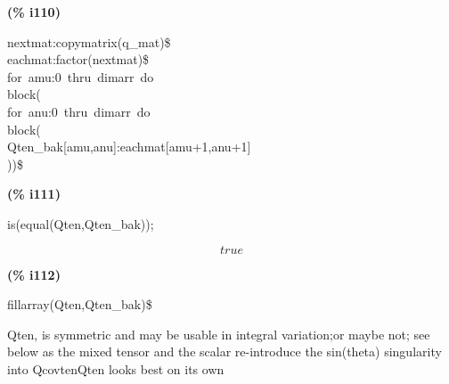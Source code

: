 \documentclass[fleqn]{article}
\begin{document}
\noindent
\begin{minipage}[t]{4.000000em}\color{red}\bfseries
(\% i110)	
\end{minipage}
\begin{minipage}[t]{\textwidth}\color{blue}
nextmat:copymatrix(q\_mat)\$\\
eachmat:factor(nextmat)\$\\
for\ amu:0\ thru\ dimarr\ do\\
block(\\
for\ anu:0\ thru\ dimarr\ do\\
block(\\
Qten\_bak[amu,anu]:eachmat[amu+1,anu+1]\\
))\$
\end{minipage}

\noindent%



\noindent
\begin{minipage}[t]{4.000000em}\color{red}\bfseries
(\% i111)	
\end{minipage}
\begin{minipage}[t]{\textwidth}\color{blue}
is(equal(Qten,Qten\_bak));
\end{minipage}
\[\displaystyle \tag{\% o111} 
true\mbox{}
\]


\noindent
\begin{minipage}[t]{4.000000em}\color{red}\bfseries
(\% i112)	
\end{minipage}
\begin{minipage}[t]{\textwidth}\color{blue}
fillarray(Qten,Qten\_bak)\$
\end{minipage}

\noindent%

Qten, is symmetric and may be usable in integral variation;or maybe not; see below as the mixed tensor and the scalar re-introduce the sin(theta) singularity into QcovtenQten looks best on its own
\end{document}
